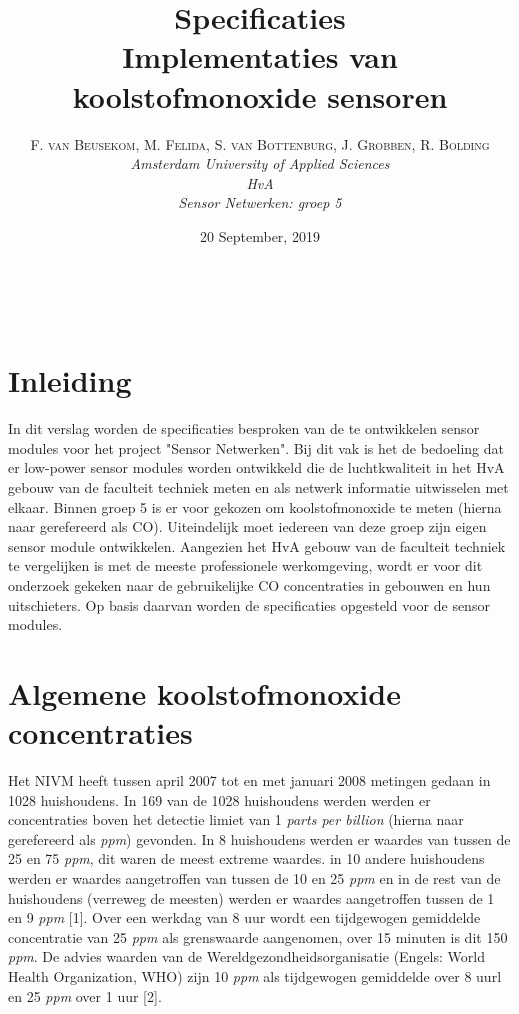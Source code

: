 \documentclass[a4paper, 11pt]{article} %
\title{\textbf{Specificaties}\\ %
Implementaties van koolstofmonoxide sensoren} %
\author{\textsc{F. van Beusekom, M. Felida, S. van Bottenburg, J. Grobben, R. Bolding} %
\\{\textit{Amsterdam University of Applied Sciences\\ 
HvA\\
Sensor Netwerken: groep 5}}} %
\date{20 September, 2019} %
\makeatletter
\renewcommand{\maketitle}{ %
\begin{flushright} %
{\LARGE\@title} %

\vspace{50pt} %

{\large\@author} %
\\\@date %

\vspace{40pt} %
\end{flushright}
}
\makeatother
\begin{document}
\captionsetup{justification=centering}
\hypersetup{hidelinks=true}
\maketitle %




\vspace{10pt} %

\newpage
\section{Inleiding}
In dit verslag worden de specificaties besproken van de te ontwikkelen sensor modules voor het project "Sensor Netwerken". Bij dit vak is het de bedoeling dat er low-power sensor modules worden ontwikkeld die de luchtkwaliteit in het HvA gebouw van de faculteit techniek meten en als netwerk informatie uitwisselen met elkaar. Binnen groep 5 is er voor gekozen om koolstofmonoxide te meten (hierna naar gerefereerd als CO). Uiteindelijk moet iedereen van deze groep zijn eigen sensor module ontwikkelen. Aangezien het HvA gebouw van de faculteit techniek te vergelijken is met de meeste professionele werkomgeving, wordt er voor dit onderzoek gekeken naar de gebruikelijke CO concentraties in gebouwen en hun uitschieters. Op basis daarvan worden de specificaties opgesteld voor de sensor modules.

\section{Algemene koolstofmonoxide concentraties}
Het NIVM heeft tussen april 2007 tot en met januari 2008 metingen gedaan in 1028 huishoudens. In 169 van de 1028 huishoudens werden werden er concentraties boven het detectie limiet van 1 \textit{parts per billion} (hierna naar gerefereerd als \textit{ppm}) gevonden. In 8 huishoudens werden er waardes van tussen de 25 en 75 \textit{ppm}, dit waren de meest extreme waardes. in 10 andere huishoudens werden er waardes aangetroffen van tussen de 10 en 25 \textit{ppm} en in de rest van de huishoudens (verreweg de meesten) werden er waardes aangetroffen tussen de 1 en 9 \textit{ppm} [1]. Over een werkdag van 8 uur wordt een tijdgewogen gemiddelde concentratie van 25 \textit{ppm} als grenswaarde aangenomen, over 15 minuten is dit 150 \textit{ppm}. De advies waarden van de Wereldgezondheidsorganisatie (Engels: World Health Organization, WHO) zijn 10 \textit{ppm} als tijdgewogen gemiddelde over 8 uurl en 25 \textit{ppm} over 1 uur [2].
\end{document}
